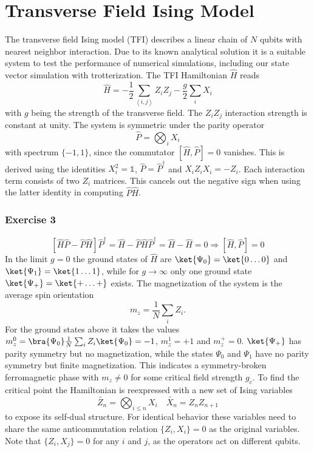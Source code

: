 \section{Transverse Field Ising Model}
The transverse field Ising model (TFI) describes a linear chain of $N$ qubits with nearest neighbor interaction. Due to its known analytical solution it is a suitable system to test the performance of numerical simulations, including our state vector simulation with trotterization. The TFI Hamiltonian $\hat{H}$ reads
\begin{equation}
    \label{eq:tfi}
    \hat{H} = -\frac{1}{2}\sum_{\left<i,j\right>}Z_iZ_j - \frac{g}{2}\sum_iX_i
\end{equation}
with $g$ being the strength of the transverse field. The $Z_iZ_j$ interaction strength is constant at unity. The system is symmetric under the parity operator 
\begin{equation}
    \hat{P} = \bigotimes_i X_i
\end{equation}
with spectrum $\{-1, 1\}$, since the commutator $[\hat{H}, \hat{P}] = 0$ vanishes. This is derived using the identities $X^2_i = \mathbb{1}$, $\hat{P} = \hat{P}^\dagger$ and $X_iZ_iX_i = -Z_i$. Each interaction term consists of two $Z_i$ matrices. This cancels out the negative sign when using the latter identity in computing $\hat{P}\hat{H}$.
\subsubsection{Exercise 3}
\begin{equation}
    \left[\hat{H}\hat{P} - \hat{P}\hat{H}\right]\hat{P}^\dagger = \hat{H} - \hat{P}\hat{H}\hat{P}^\dagger = \hat{H} - \hat{H} = 0 \Rightarrow [\hat{H}, \hat{P}] = 0
\end{equation}
In the limit $g = 0$ the ground states of $\hat{H}$ are $\ket{\Psi_0} = \ket{0\ldots 0}$ and $\ket{\Psi_1} = \ket{1\ldots1}$, while for $g \to \infty$ only one ground state $\ket{\Psi_+} = \ket{+\ldots+}$ exists. The magnetization of the system is the average spin orientation
\begin{equation}
    m_z = \frac{1}{N}\sum_i Z_i.
\end{equation}
For the ground states above it takes the values $m^0_z = \bra{\Psi_0}\frac{1}{N}\sum_i Z_i\ket{\Psi_0} = -1$, $m^1_z = +1$ and $m^+_z = 0$. $\ket{\Psi_+}$ has parity symmetry but no magnetization, while the states $\Psi_0$ and $\Psi_1$ have no parity symmetry but finite magnetization. This indicates a symmetry-broken ferromagnetic phase with $m_z \neq 0$ for some critical field strength $g_c$. To find the critical point the Hamiltonian is reexpressed with a new set of Ising variables
\begin{equation}
    \label{eq:ising}
    \tilde{Z_n} = \bigotimes_{i \leq n} X_i \quad \tilde{X_n} = Z_nZ_{n+1}
\end{equation}
to expose its self-dual structure. For identical behavior these variables need to share the same anticommutation relation $\{Z_i, X_i\} = 0$ as the original variables. Note that $\{Z_i, X_j\} = 0$ for any $i$ and $j$, as the operators act on different qubits. 
